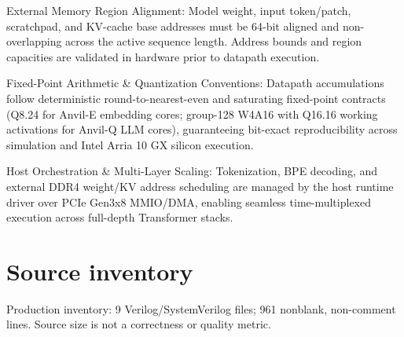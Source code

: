 \documentclass[11pt,a4paper]{article}
\begin{document}
External Memory Region Alignment: Model weight,\allowbreak{} input token/\allowbreak{}patch,\allowbreak{} scratchpad,\allowbreak{} and KV-cache base addresses must be 64-bit aligned and non-overlapping across the active sequence length. Address bounds and region capacities are validated in hardware prior to datapath execution.


Fixed-Point Arithmetic \& Quantization Conventions: Datapath accumulations follow deterministic round-to-nearest-even and saturating fixed-point contracts (\allowbreak{}Q8.24 for Anvil-E embedding cores; group-128 W4A16 with Q16.16 working activations for Anvil-Q LLM cores)\allowbreak{},\allowbreak{} guaranteeing bit-exact reproducibility across simulation and Intel Arria 10 GX silicon execution.


Host Orchestration \& Multi-Layer Scaling: Tokenization,\allowbreak{} BPE decoding,\allowbreak{} and external DDR4 weight/\allowbreak{}KV address scheduling are managed by the host runtime driver over PCIe Gen3x8 MMIO/\allowbreak{}DMA,\allowbreak{} enabling seamless time-multiplexed execution across full-depth Transformer stacks.


\appendix{}\section{Source inventory}

Production inventory: 9 Verilog/\allowbreak{}SystemVerilog files; 961 nonblank,\allowbreak{} non-comment lines. Source size is not a correctness or quality metric.
\end{document}
